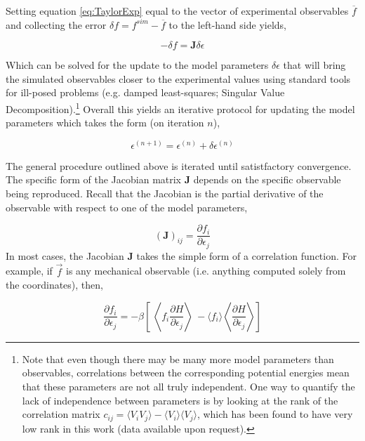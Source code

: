 \documentclass[preprint]{elsarticle}
\begin{document}
    Setting equation \ref{eq:TaylorExp} equal to the vector of experimental
observables $\overline{f}$ and collecting the error $\delta f = f^{sim} -
\overline{f}$ to the left-hand side yields,

\begin{equation}
\label{eq:dfJdeps}
    -\delta f = \bm{J}\delta\epsilon
\end{equation}

    Which can be solved for the update to the model parameters $\delta\epsilon$
that will bring the simulated observables closer to the experimental values
using standard tools for ill-posed problems (e.g. damped
least-squares\cite{Marquardt1963}; Singular Value Decomposition).\footnote{Note
that even though there may be many more model parameters than observables,
correlations between the corresponding potential energies mean that these
parameters are not all truly independent. One way to quantify the lack of
independence between parameters is by looking at the rank of the correlation
matrix $c_{ij} = \langle V_iV_j\rangle - \langle V_i\rangle \langle V_j
\rangle$, which has been found to have very low rank in this work (data
available upon request).} Overall this yields an iterative protocol for
updating the model parameters which takes the form (on iteration $n$),

\begin{equation}
    \epsilon^{(n+1)} = \epsilon^{(n)} + \delta\epsilon^{(n)}
\end{equation}

    The general procedure outlined above is iterated until satistfactory
convergence. The specific form of the Jacobian matrix $\bm{J}$ depends on the
specific observable being reproduced. Recall that the Jacobian is the partial
derivative of the observable with respect to one of the model parameters,

\begin{equation}
    \left(\bm{J}\right)_{ij} = \frac{\partial f_i}{\partial\epsilon_j} 
\end{equation}
    In most cases, the Jacobian $\bm{J}$ takes the simple form of a correlation
function. For example, if $\vec{f}$ is any mechanical observable (i.e. anything
computed solely from the coordinates), then,

\begin{equation}
    \frac{\partial f_i}{\partial\epsilon_j} = -\beta\left[ \
    \left\langle f_i \frac{\partial H}{\partial\epsilon_j}\right\rangle \
  - \langle f_i \rangle \left\langle \frac{\partial H}{\partial\epsilon_j} \right\rangle\right]  
\end{equation}
\end{document}
